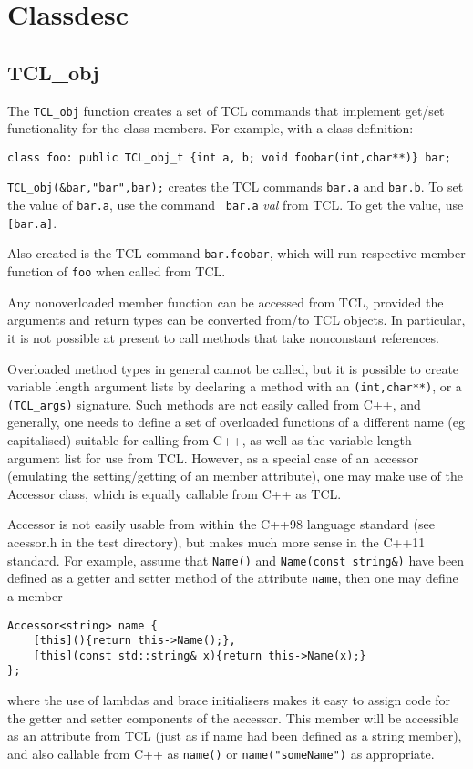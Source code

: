 \section{Classdesc}



\subsection{TCL\_obj}\label{TCL_obj}

The {\tt TCL\_obj} function creates a set of TCL commands that
implement get/set functionality for the class members. For example,
with a class definition:
\begin{verbatim}
class foo: public TCL_obj_t {int a, b; void foobar(int,char**)} bar;
\end{verbatim}
\verb+TCL_obj(&bar,"bar",bar);+ creates the TCL commands {\tt bar.a}
and {\tt bar.b}. To set the value of {\tt bar.a}, use the command {\tt
  bar.a} {\em val} from TCL. To get the value, use {\tt [bar.a]}.

Also created is the TCL command {\tt bar.foobar}, which will run
respective member function of {\tt foo} when called from TCL.

Any nonoverloaded member function can be accessed from TCL, provided
the arguments and return types can be converted from/to TCL
objects. In particular, it is not possible at present to call methods
that take nonconstant references.

Overloaded method types in general cannot be called, but it is
possible to create variable length argument lists by declaring a
method with an \verb+(int,char**)+, or a \verb+(TCL_args)+
signature. Such methods are not easily called from C++, and generally,
one needs to define a set of overloaded functions of a different name
(eg capitalised) suitable for calling
from C++, as well as the variable length argument list for use from
TCL. However, as a special case of an accessor (emulating the
setting/getting of an member attribute), one may make use of the
Accessor class, which is equally callable from C++ as
TCL.

Accessor is not easily usable from within the C++98 language standard
(see acessor.h in the test directory), but makes much more sense in
the C++11 standard. For example, assume that \verb+Name()+ and
\verb+Name(const string&)+ have been defined as a getter and setter
method of the attribute \verb+name+, then one may define a member
\begin{verbatim}
Accessor<string> name {
    [this](){return this->Name();}, 
    [this](const std::string& x){return this->Name(x);}
};
\end{verbatim}
where the use of lambdas and brace initialisers makes it easy to
assign code for the getter and setter components of the accessor. This
member will be accessible as an attribute from TCL (just as if name
had been defined as a string member), and also callable from C++ as
\verb+name()+ or \verb+name("someName")+ as appropriate.

